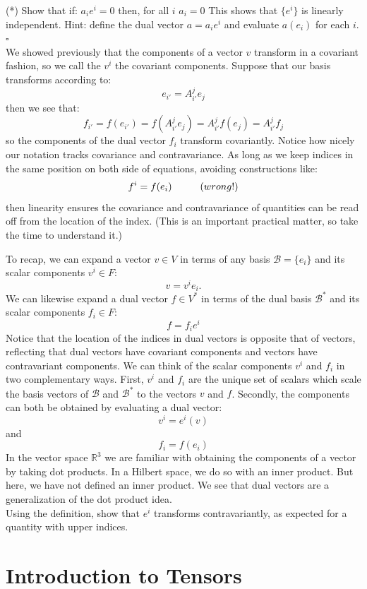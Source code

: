 \documentclass[12pt]{article}
\begin{document}
\exercise (*)
Show that if:
$a_i e^i = 0$
then, for all $i$
$a_i = 0$
This shows that $\{e^i\}$ is linearly independent.
Hint: define the dual vector
$a = a_i e^i$
and evaluate $a(e_i)$ for each $i$.  $\square$ \\[3pt]

We showed previously that the components of a vector $v$ transform in a
covariant fashion, so we call the $v^i$ the covariant components.
Suppose that our basis transforms according to:
$$e_{i'} = A^{j}_{i'} e_{j}$$
then we see that:
$$f_{i'} = f(e_{i'}) = f(A^{j}_{i'} e_{j}) = A^{j}_{i'} f(e_{j}) = A^{j}_{i'} f_j$$
so the components of the dual vector $f_i$ transform covariantly.  Notice how nicely our notation tracks covariance and contravariance.  As long as we keep indices in the same position on both side of equations, avoiding constructions like:
$$f^i = f(e_i) \hspace{1cm} \text(wrong!)$$
then linearity ensures the covariance and contravariance of quantities
can be read off from the location of the index.  (This is an important
practical matter, so take the time to understand it.)

To recap, we can expand a vector $v \in V$ in terms of any basis
$\mathcal{B}=\{e_i\}$ and its scalar components $v^i \in F$:
$$v = v^i e_i.$$
We can likewise expand a dual vector $f \in V^*$ in terms of the dual
basis $\mathcal{B}^*$ and its scalar components $f_i \in F$:
$$f = f_i e^i$$
Notice that the location of the indices in dual vectors is opposite
that of vectors, reflecting that dual vectors have covariant
components and vectors have contravariant components.  We can think of
the scalar components $v^i$ and $f_i$ in two complementary ways.
First, $v^i$ and $f_i$ are the unique set of scalars which scale the
basis vectors of $\mathcal{B}$ and $\mathcal{B}^*$ to the vectors $v$
and $f$.  Secondly, the components can both be obtained by evaluating
a dual vector:
$$v^i = e^i(v)$$
and
$$f_i = f(e_i)$$
In the vector space $\mathbb{R}^3$ we are familiar with obtaining the
components of a vector by taking dot products.  In a Hilbert space, we
do so with an inner product.  But here, we have not defined an inner
product.  We see that dual vectors are a generalization of the dot
product idea.\\[3pt]

\exercise Using the definition, show that $e^i$ transforms
contravariantly, as expected for a quantity with upper indices.\\[3pt]


\section{Introduction to Tensors}
\label{sec:tensors}
\end{document}
